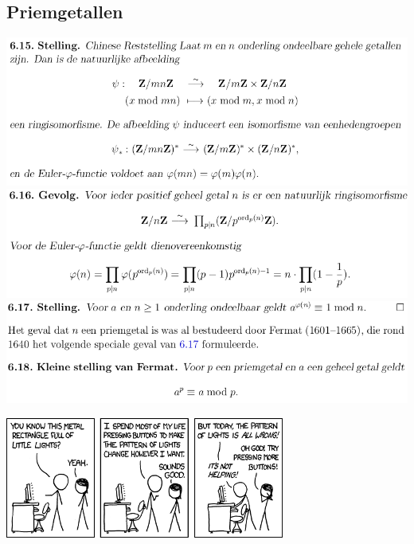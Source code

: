 \documentclass[10pt,a4paper,titlepage]{article}
\begin{document}
\subsection{Priemgetallen}

\includegraphics[width=\textwidth]{Selection_259}\\
\includegraphics[width=\textwidth]{Selection_260}\\
\includegraphics[width=\textwidth]{Selection_261}\\

\vfill
\begin{center}
\includegraphics[height=150px]{XKCD0722.png}
\end{center}
\end{document}
